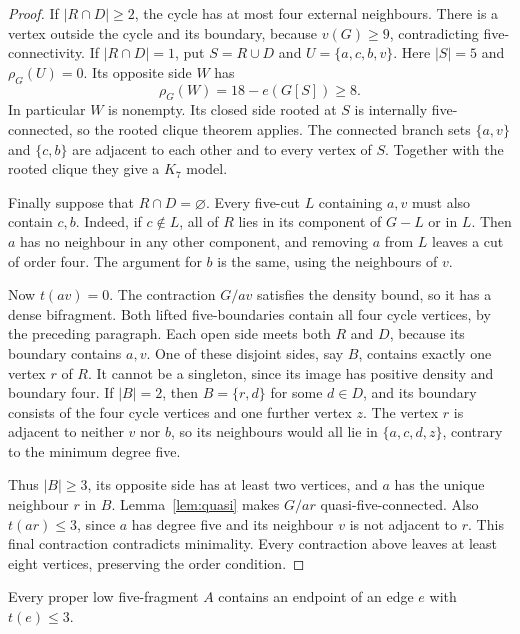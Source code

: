 \begin{proof}
If $|R\cap D|\geq2$, the cycle has at most four external neighbours.
There is a vertex outside the cycle and its boundary, because
$v(G)\geq9$, contradicting five-connectivity. If $|R\cap D|=1$,
put $S=R\cup D$ and $U=\{a,c,b,v\}$. Here $|S|=5$ and
$\rho_G(U)=0$. Its opposite side $W$ has
\[
 \rho_G(W)=18-e(G[S])\geq8.
\]
In particular $W$ is nonempty. Its closed side rooted at $S$ is
internally five-connected, so the rooted clique theorem applies.
The connected branch sets $\{a,v\}$ and $\{c,b\}$ are adjacent to each
other and to every vertex of $S$. Together with the rooted clique
they give a $K_7$ model.

Finally suppose that $R\cap D=\varnothing$. Every five-cut $L$
containing $a,v$ must also contain $c,b$. Indeed, if $c\notin L$,
all of $R$ lies in its component of $G-L$ or in $L$. Then $a$ has
no neighbour in any other component, and removing $a$ from $L$
leaves a cut of order four. The argument for $b$ is the same, using
the neighbours of $v$.

Now $t(av)=0$. The contraction $G/av$ satisfies the density bound, so
it has a dense bifragment. Both lifted five-boundaries contain all
four cycle vertices, by the preceding paragraph. Each open side
meets both $R$ and $D$, because its boundary contains $a,v$.
One of these disjoint sides, say $B$, contains exactly one vertex
$r$ of $R$. It cannot be a singleton, since its image has positive
density and boundary four. If $|B|=2$, then $B=\{r,d\}$ for some
$d\in D$, and its boundary consists of the four cycle vertices
and one further vertex $z$. The vertex $r$ is adjacent to neither
$v$ nor $b$, so its neighbours would all lie in $\{a,c,d,z\}$,
contrary to the minimum degree five.

Thus $|B|\geq3$, its opposite side has at least two vertices,
and $a$ has the unique neighbour $r$ in $B$. Lemma~\ref{lem:quasi}
makes $G/ar$ quasi-five-connected. Also $t(ar)\leq3$, since $a$
has degree five and its neighbour $v$ is not adjacent to $r$.
This final contraction contradicts minimality. Every contraction
above leaves at least eight vertices, preserving the order condition.
\end{proof}

\begin{lemma}\label{gl:low-edge}
Every proper low five-fragment $A$ contains an endpoint of an edge
$e$ with $t(e)\leq3$.
\end{lemma}

